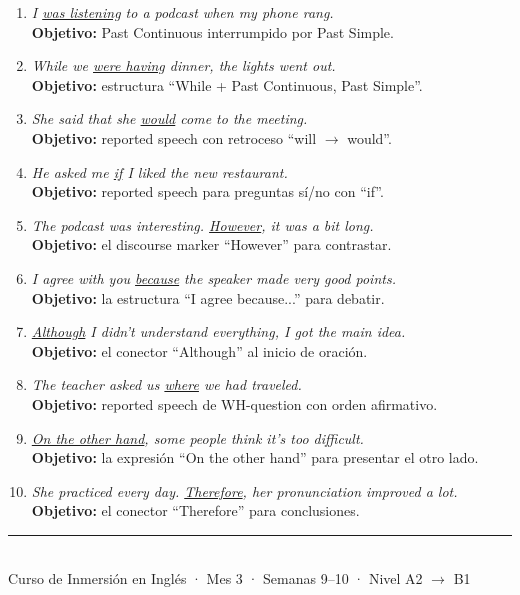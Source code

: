 \documentclass[12pt,a4paper]{article}
\begin{document}
\begin{cajamineria}

\begin{enumerate}[leftmargin=1.2cm]
  \item \textit{I \underline{was listening} to a podcast when my phone rang.}\\
    {\small\textbf{Objetivo:} Past Continuous interrumpido por Past Simple.}

  \item \textit{While we \underline{were having} dinner, the lights went out.}\\
    {\small\textbf{Objetivo:} estructura ``While + Past Continuous, Past Simple''.}

  \item \textit{She said that she \underline{would} come to the meeting.}\\
    {\small\textbf{Objetivo:} reported speech con retroceso ``will $\rightarrow$ would''.}

  \item \textit{He asked me \underline{if} I liked the new restaurant.}\\
    {\small\textbf{Objetivo:} reported speech para preguntas sí/no con ``if''.}

  \item \textit{The podcast was interesting. \underline{However}, it was a bit long.}\\
    {\small\textbf{Objetivo:} el discourse marker ``However'' para contrastar.}

  \item \textit{I agree with you \underline{because} the speaker made very good points.}\\
    {\small\textbf{Objetivo:} la estructura ``I agree because...'' para debatir.}

  \item \textit{\underline{Although} I didn't understand everything, I got the main idea.}\\
    {\small\textbf{Objetivo:} el conector ``Although'' al inicio de oración.}

  \item \textit{The teacher asked us \underline{where} we had traveled.}\\
    {\small\textbf{Objetivo:} reported speech de WH-question con orden afirmativo.}

  \item \textit{\underline{On the other hand}, some people think it's too difficult.}\\
    {\small\textbf{Objetivo:} la expresión ``On the other hand'' para presentar el otro lado.}

  \item \textit{She practiced every day. \underline{Therefore}, her pronunciation improved a lot.}\\
    {\small\textbf{Objetivo:} el conector ``Therefore'' para conclusiones.}
\end{enumerate}
\end{cajamineria}

\vfill
\begin{center}
\rule{0.5\textwidth}{0.5pt}\\[0.3cm]
{\small\color{grissuave} Curso de Inmersión en Inglés · Mes 3 · Semanas 9--10 · Nivel A2 $\rightarrow$ B1}
\end{center}
\end{document}
